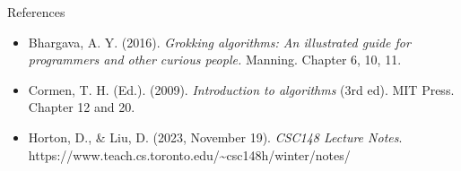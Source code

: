 \documentclass[
  ignorenonframetext,
]{beamer}
\begin{document}
\begin{frame}{References}
\protect\hypertarget{references}{}
\begin{itemize}
\item
  Bhargava, A. Y. (2016). \emph{Grokking algorithms: An illustrated
  guide for programmers and other curious people.} Manning. Chapter 6,
  10, 11.
\item
  Cormen, T. H. (Ed.). (2009). \emph{Introduction to algorithms} (3rd
  ed). MIT Press. Chapter 12 and 20.
\item
  Horton, D., \& Liu, D. (2023, November 19). \emph{CSC148 Lecture
  Notes}.
  https://www.teach.cs.toronto.edu/\textasciitilde csc148h/winter/notes/
\end{itemize}
\end{frame}
\end{document}
